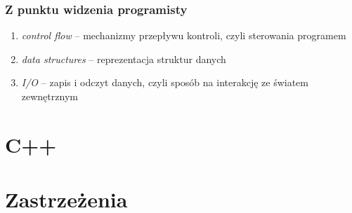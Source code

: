 \documentclass[aspectratio=169]{beamer}
\begin{document}
\begin{frame}
    \frametitle{Z punktu widzenia programisty}

    \begin{enumerate}
        \item \emph{control flow} -- mechanizmy przepływu kontroli, czyli
            sterowania programem
        \item \emph{data structures} -- reprezentacja struktur danych
        \item \emph{I/O} -- zapis i odczyt danych, czyli sposób na interakcję ze
            światem zewnętrznym
    \end{enumerate}
\end{frame}

\section{C++}

\section{Zastrzeżenia}
\end{document}
